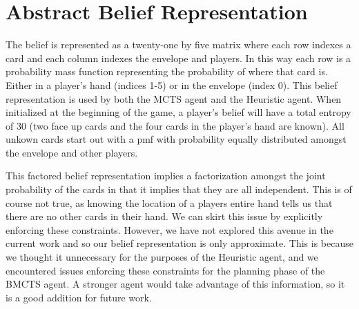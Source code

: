 \documentclass[msc, deptreport, ai, romanprepages]{infthesis}
\begin{document}
\chapter{Abstract Belief Representation}
The belief is represented as a twenty-one by five matrix where each row indexes a card and each column indexes the envelope and players. In this way each row is a probability mass function representing the probability of where that card is. Either in a player's hand (indices 1-5) or in the envelope (index 0). This belief representation is used by both the MCTS agent and the Heuristic agent. When initialized at the beginning of the game, a player's belief will have a total entropy of 30 (two face up cards and the four cards in the player's hand are known). All unkown cards start out with a pmf with probability equally distributed amongst the envelope and other players. 

This factored belief representation implies a factorization amongst the joint probability of the cards in that it implies that they are all independent. This is of course not true, as knowing the location of a players entire hand tells us that there are no other cards in their hand. We can skirt this issue by explicitly enforcing these constraints. However, we have not explored this avenue in the current work and so our belief representation is only approximate. This is because we thought it unnecessary for the purposes of the Heuristic agent, and we encountered issues enforcing these constraints for the planning phase of the BMCTS agent. A stronger agent would take advantage of this information, so it is a good addition for future work.

\newpage
\nocite{*}
 

\end{document}
